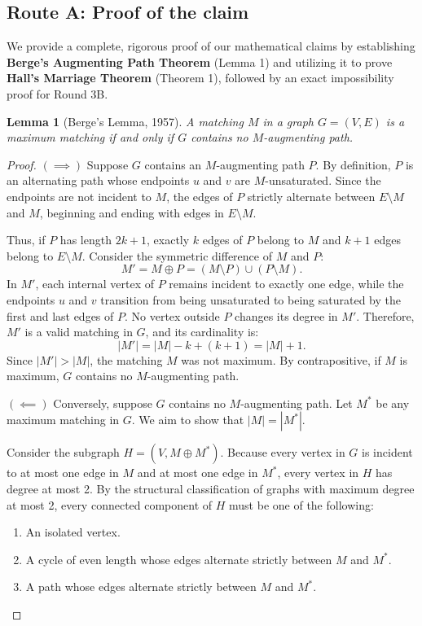 \documentclass[11pt,a4paper]{article}
\newtheorem{lemma}{Lemma}
\begin{document}
\subsection*{Route A: Proof of the claim}

We provide a complete, rigorous proof of our mathematical claims by establishing \textbf{Berge's Augmenting Path Theorem} (Lemma 1) and utilizing it to prove \textbf{Hall's Marriage Theorem} (Theorem 1), followed by an exact impossibility proof for Round 3B.

\begin{lemma}[Berge's Lemma, 1957]
A matching $M$ in a graph $G = (V, E)$ is a maximum matching if and only if $G$ contains no $M$-augmenting path.
\end{lemma}

\begin{proof}
$(\implies)$ Suppose $G$ contains an $M$-augmenting path $P$. By definition, $P$ is an alternating path whose endpoints $u$ and $v$ are $M$-unsaturated. Since the endpoints are not incident to $M$, the edges of $P$ strictly alternate between $E \setminus M$ and $M$, beginning and ending with edges in $E \setminus M$. 

Thus, if $P$ has length $2k + 1$, exactly $k$ edges of $P$ belong to $M$ and $k + 1$ edges belong to $E \setminus M$. Consider the symmetric difference of $M$ and $P$:
\[
  M' = M \oplus P = (M \setminus P) \cup (P \setminus M).
\]
In $M'$, each internal vertex of $P$ remains incident to exactly one edge, while the endpoints $u$ and $v$ transition from being unsaturated to being saturated by the first and last edges of $P$. No vertex outside $P$ changes its degree in $M'$. Therefore, $M'$ is a valid matching in $G$, and its cardinality is:
\[
  |M'| = |M| - k + (k + 1) = |M| + 1.
\]
Since $|M'| > |M|$, the matching $M$ was not maximum. By contrapositive, if $M$ is maximum, $G$ contains no $M$-augmenting path.

$(\impliedby)$ Conversely, suppose $G$ contains no $M$-augmenting path. Let $M^*$ be any maximum matching in $G$. We aim to show that $|M| = |M^*|$.

Consider the subgraph $H = (V, M \oplus M^*)$. Because every vertex in $G$ is incident to at most one edge in $M$ and at most one edge in $M^*$, every vertex in $H$ has degree at most 2. By the structural classification of graphs with maximum degree at most 2, every connected component of $H$ must be one of the following:
\begin{enumerate}
  \item An isolated vertex.
  \item A cycle of even length whose edges alternate strictly between $M$ and $M^*$.
  \item A path whose edges alternate strictly between $M$ and $M^*$.
\end{enumerate}


\end{proof}
\end{document}
